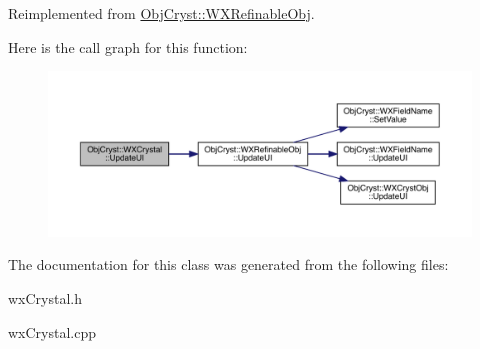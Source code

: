 Reimplemented from \mbox{\hyperlink{class_obj_cryst_1_1_w_x_refinable_obj_acbf70975a79661a73a1ae3c39c9c3045}{Obj\+Cryst\+::\+W\+X\+Refinable\+Obj}}.

Here is the call graph for this function\+:
\nopagebreak
\begin{figure}[H]
\begin{center}
\leavevmode
\includegraphics[width=350pt]{class_obj_cryst_1_1_w_x_crystal_a62946717943682dc2ac07ea4584030f4_cgraph}
\end{center}
\end{figure}


The documentation for this class was generated from the following files\+:\begin{DoxyCompactItemize}
\item 
wx\+Crystal.\+h\item 
wx\+Crystal.\+cpp\end{DoxyCompactItemize}
